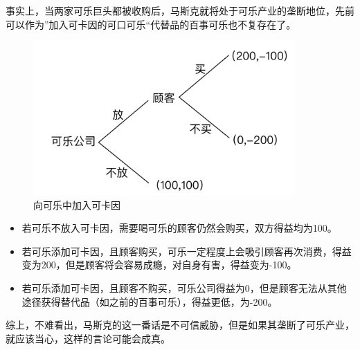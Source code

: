 \documentclass[UTF8]{article}
\begin{document}
    事实上，当两家可乐巨头都被收购后，马斯克就将处于可乐产业的垄断地位，先前可以作为”加入可卡因的可口可乐“代替品的百事可乐也不复存在了。
    \begin{figure}[H]
      \centering
      \includegraphics[width = 10cm]{cola.jpeg}
      \caption{向可乐中加入可卡因}
    \end{figure}
    \begin{itemize}
      \item 若可乐不放入可卡因，需要喝可乐的顾客仍然会购买，双方得益均为100。
      \item 若可乐添加可卡因，且顾客购买，可乐一定程度上会吸引顾客再次消费，得益变为200，但是顾客将会容易成瘾，对自身有害，得益变为-100。
      \item 若可乐添加可卡因，且顾客不购买，可乐公司得益为0，但是顾客无法从其他途径获得替代品（如之前的百事可乐），得益更低，为-200。
    \end{itemize}
    
    综上，不难看出，马斯克的这一番话是不可信威胁，但是如果其垄断了可乐产业，就应该当心，这样的言论可能会成真。
\end{document}
